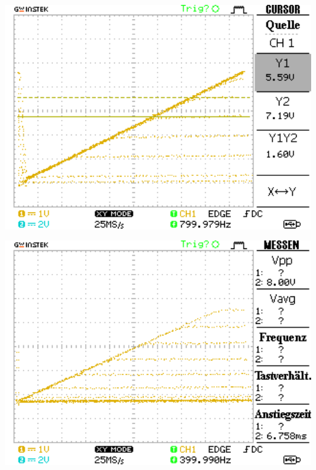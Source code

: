 \documentclass[10pt]{article}
\newenvironment{Figure}
  {\par\medskip\noindent\minipage{\linewidth}}
  {\endminipage\par\medskip}
\begin{document}
\begin{multicols}{2}
	\begin{Figure}
		\centering\includegraphics[width=1\textwidth]{data/Kennlinie4_npn.png}
		\label{fig:1.6}
	\end{Figure}


	\begin{Figure}
		\centering\includegraphics[width=1\textwidth]{data/DS0000.png}
		\label{fig:1.7}
	\end{Figure}

        \newpage

\end{multicols}
\end{document}
